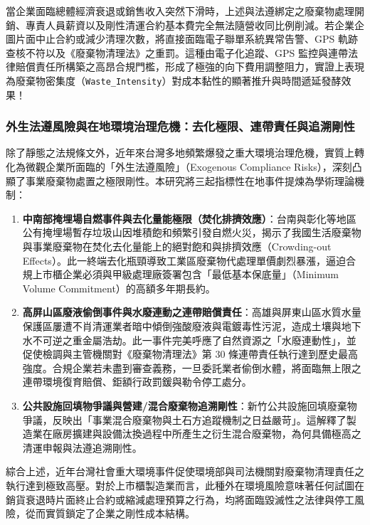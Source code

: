 \documentclass[12pt,a4paper]{article}
\begin{document}
當企業面臨總體經濟衰退或銷售收入突然下滑時，上述與法遵綁定之廢棄物處理開銷、專責人員薪資以及剛性清運合約基本費完全無法隨營收同比例削減。若企業企圖片面中止合約或減少清理次數，將直接面臨電子聯單系統異常告警、GPS 軌跡查核不符以及《廢棄物清理法》之重罰。這種由電子化追蹤、GPS 監控與連帶法律賠償責任所構築之高昂合規門檻，形成了極強的向下費用調整阻力，實證上表現為廢棄物密集度（\texttt{Waste\_Intensity}）對成本黏性的顯著推升與時間遞延發酵效果！

\subsubsection{外生法遵風險與在地環境治理危機：去化極限、連帶責任與追溯剛性}

除了靜態之法規條文外，近年來台灣多地頻繁爆發之重大環境治理危機，實質上轉化為微觀企業所面臨的「外生法遵風險」（Exogenous Compliance Risks），深刻凸顯了事業廢棄物處置之極限剛性。本研究將三起指標性在地事件提煉為學術理論機制：

\begin{enumerate}[leftmargin=*]
    \item \textbf{中南部掩埋場自燃事件與去化量能極限（焚化排擠效應）}：台南與彰化等地區公有掩埋場暫存垃圾山因堆積飽和頻繁引發自燃火災，揭示了我國生活廢棄物與事業廢棄物在焚化去化量能上的絕對飽和與排擠效應（Crowding-out Effects）。此一終端去化瓶頸導致工業區廢棄物代處理單價劇烈暴漲，逼迫合規上市櫃企業必須與甲級處理廠簽署包含「最低基本保底量」（Minimum Volume Commitment）的高額多年期長約。
    \item \textbf{高屏山區廢液偷倒事件與水廢連動之連帶賠償責任}：高雄與屏東山區水質水量保護區屢遭不肖清運業者暗中傾倒強酸廢液與電鍍毒性污泥，造成土壤與地下水不可逆之重金屬浩劫。此一事件完美呼應了自然資源之「水廢連動性」，並促使檢調與主管機關對《廢棄物清理法》第 30 條連帶責任執行達到歷史最高強度。合規企業若未盡到審查義務，一旦委託業者偷倒水體，將面臨無上限之連帶環境復育賠償、鉅額行政罰鍰與勒令停工處分。
    \item \textbf{公共設施回填物爭議與營建/混合廢棄物追溯剛性}：新竹公共設施回填廢棄物爭議，反映出「事業混合廢棄物與土石方追蹤機制之日益嚴苛」。這解釋了製造業在廠房擴建與設備汰換過程中所產生之衍生混合廢棄物，為何具備極高之清運申報與法遵追溯剛性。
\end{enumerate}

綜合上述，近年台灣社會重大環境事件促使環境部與司法機關對廢棄物清理責任之執行達到極致高壓。對於上市櫃製造業而言，此種外在環境風險意味著任何試圖在銷貨衰退時片面終止合約或縮減處理預算之行為，均將面臨毀滅性之法律與停工風險，從而實質鎖定了企業之剛性成本結構。
\end{document}
